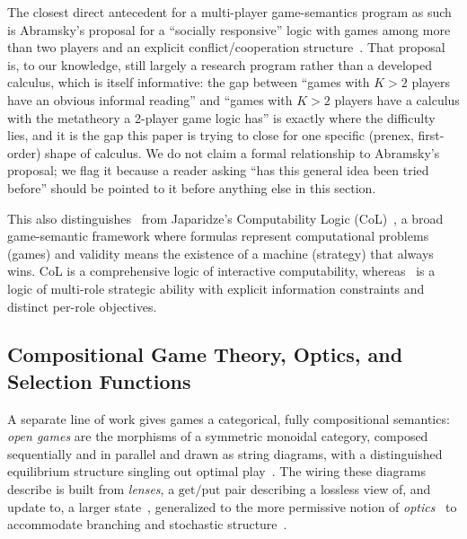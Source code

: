 The closest direct antecedent for a multi-player game-semantics program as such is Abramsky's proposal for a ``socially responsive'' logic with games among more than two players and an explicit conflict/cooperation structure~\cite{Abramsky2006SociallyResponsive}. That proposal is, to our knowledge, still largely a research program rather than a developed calculus, which is itself informative: the gap between ``games with $K>2$ players have an obvious informal reading'' and ``games with $K>2$ players have a calculus with the metatheory a 2-player game logic has'' is exactly where the difficulty lies, and it is the gap this paper is trying to close for one specific (prenex, first-order) shape of calculus. We do not claim a formal relationship to Abramsky's proposal; we flag it because a reader asking ``has this general idea been tried before'' should be pointed to it before anything else in this section.

This also distinguishes \KFOL\ from Japaridze's Computability Logic (CoL)~\cite{japaridze2024propositional}, a broad
game-semantic framework where formulas represent computational problems
(games) and validity means the existence of a machine (strategy) that
always wins. CoL is a comprehensive logic of interactive computability,
whereas \KFOL\ is a logic of multi-role strategic ability with explicit
information constraints and distinct per-role objectives.

\subsection{Compositional Game Theory, Optics, and Selection Functions}
\label{subsec:open-games}

A separate line of work gives games a categorical, fully compositional
semantics: \emph{open games} are the morphisms of a symmetric monoidal
category, composed sequentially and in parallel and drawn as string diagrams,
with a distinguished equilibrium structure singling out optimal
play~\cite{GhaniHedgesWinschelZahn2018CompositionalGameTheory,Hedges2016Thesis}.
The wiring these diagrams describe is built from \emph{lenses}, a
$\mathrm{get}/\mathrm{put}$ pair describing a lossless view of, and update to,
a larger state~\cite{FosterEtAl2007Lenses}, generalized to the more permissive
notion of \emph{optics}~\cite{Riley2018CategoriesOfOptics} to accommodate
branching and stochastic structure~\cite{BoltHedgesZahn2023BayesianOpenGames}.

